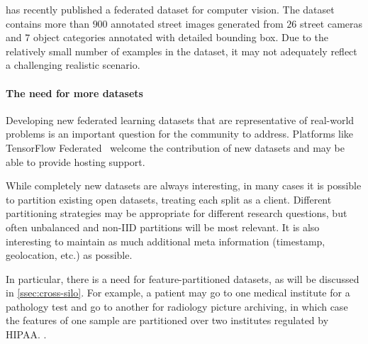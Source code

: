 
\citet{luo2019real} has recently published a federated dataset for computer vision. The dataset contains more than $900$ annotated street images generated from $26$ street cameras and $7$ object categories annotated with detailed bounding box. Due to the relatively small number of examples in the dataset, it may not adequately reflect a challenging realistic scenario.

\paragraph{The need for more datasets}
Developing new federated learning datasets that are representative of real-world problems is an important question for the community to address. Platforms like TensorFlow Federated~\citep{tff} welcome the contribution of new datasets and may be able to provide hosting support.

While completely new datasets are always interesting, in many cases it is possible to partition existing open datasets, treating each split as a client. Different partitioning strategies may be appropriate for different research questions, but often unbalanced and non-IID partitions will be most relevant. It is also interesting to maintain as much additional meta information (timestamp, geolocation, etc.) as possible.

In particular, there is a need for feature-partitioned datasets, as will be discussed in \cref{ssec:cross-silo}. For example, a patient may go to one medical institute for a pathology test and go to another for radiology picture archiving, in which case the features of one sample are partitioned over two institutes regulated by HIPAA. \citep{annas2003hipaa}.
